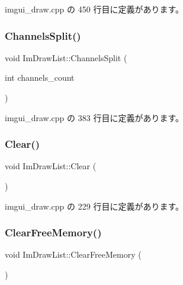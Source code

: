  imgui\+\_\+draw.\+cpp の 450 行目に定義があります。

\mbox{\label{struct_im_draw_list_a426f124ba049bed2d38c850c65f9f917}} 
\subsubsection{\texorpdfstring{Channels\+Split()}{ChannelsSplit()}}
{\footnotesize\ttfamily void Im\+Draw\+List\+::\+Channels\+Split (\begin{DoxyParamCaption}\item[{int}]{channels\+\_\+count }\end{DoxyParamCaption})}



 imgui\+\_\+draw.\+cpp の 383 行目に定義があります。

\mbox{\label{struct_im_draw_list_ac422590c71dc5593aea52f65793aee81}} 
\subsubsection{\texorpdfstring{Clear()}{Clear()}}
{\footnotesize\ttfamily void Im\+Draw\+List\+::\+Clear (\begin{DoxyParamCaption}{ }\end{DoxyParamCaption})}



 imgui\+\_\+draw.\+cpp の 229 行目に定義があります。

\mbox{\label{struct_im_draw_list_a8b2686e006f57c554b709dfc47e2ad63}} 
\subsubsection{\texorpdfstring{Clear\+Free\+Memory()}{ClearFreeMemory()}}
{\footnotesize\ttfamily void Im\+Draw\+List\+::\+Clear\+Free\+Memory (\begin{DoxyParamCaption}{ }\end{DoxyParamCaption})}



